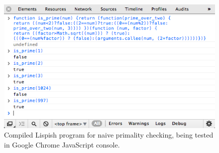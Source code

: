 \begin{figure}[ht]
	\centering
	\includegraphics[scale=0.65]{Graphics/primality_test.png}
\caption{Compiled Lispish program for naive primality checking, being tested in Google Chrome JavaScript console.}
\label{fig:primality-javascript-test}
\end{figure}
